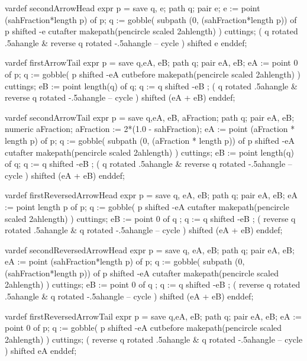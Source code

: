   vardef secondArrowHead expr p =
    save q, e; path q; pair e;
    e := point (sahFraction*length p) of p;
    q := gobble(
      subpath (0, (sahFraction*length p)) of p shifted -e 
      cutafter makepath(pencircle scaled 2ahlength)
    ) cuttings;
    (
      q rotated .5ahangle &
      reverse q rotated -.5ahangle --
      cycle
    )  shifted e
  enddef;
  
  vardef firstArrowTail expr p =
    save q,eA, eB; path q; pair eA, eB;
    eA := point 0 of p;
    q := gobble(
      p shifted -eA
      cutbefore makepath(pencircle scaled 2ahlength)
    ) cuttings;
    eB := point length(q) of q;
    q := q shifted -eB ;
    (
      q rotated .5ahangle &
      reverse q rotated -.5ahangle --
      cycle
    ) shifted (eA + eB)
  enddef;
  
  vardef secondArrowTail expr p =
    save q,eA, eB, aFraction; path q;
    pair eA, eB; numeric aFraction;
    aFraction := 2*(1.0 - sahFraction);
    eA := point (aFraction * length p) of p;
    q := gobble(
      subpath (0, (aFraction * length p)) of p shifted -eA
      cutafter makepath(pencircle scaled 2ahlength)
    ) cuttings;
    eB := point length(q) of q;
    q := q shifted -eB ;
    (
      q rotated .5ahangle &
      reverse q rotated -.5ahangle --
      cycle
    ) shifted (eA + eB)
  enddef;

  
  vardef firstReversedArrowHead expr p =
    save q, eA, eB; path q; pair eA, eB;
    eA := point length p of p;
    q := gobble(
      p shifted -eA 
      cutafter makepath(pencircle scaled 2ahlength)
    ) cuttings;
    eB := point 0 of q ;
    q := q shifted -eB ;
    (
      reverse q rotated .5ahangle &
      q rotated -.5ahangle --
      cycle
    ) shifted (eA + eB)
  enddef;

  vardef secondReversedArrowHead expr p =
    save q, eA, eB; path q; pair eA, eB;
    eA := point (sahFraction*length p) of p;
    q := gobble(
      subpath (0, (sahFraction*length p)) of p shifted -eA 
      cutafter makepath(pencircle scaled 2ahlength)
    ) cuttings;
    eB := point 0 of q ;
    q := q shifted -eB ;
    (
      reverse q rotated .5ahangle &
      q rotated -.5ahangle --
      cycle
    ) shifted (eA + eB)
  enddef;

  vardef firstReversedArrowTail expr p =
    save q,eA, eB; path q; pair eA, eB;
    eA := point 0 of p;
    q := gobble(
      p shifted -eA
      cutbefore makepath(pencircle scaled 2ahlength)
    ) cuttings;
    (
      reverse q rotated .5ahangle &
      q rotated -.5ahangle --
      cycle
    ) shifted eA
  enddef;
  
